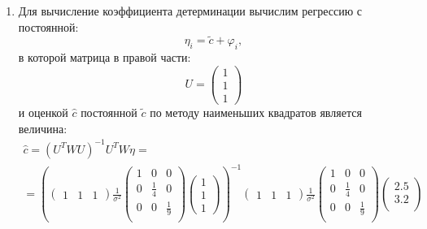 \documentclass[a4paper,12pt]{article}
\begin{document}
\begin{enumerate}
    \item
          Для вычисление коэффициента детерминации вычислим регрессию с постоянной:
          \[
              \eta_i = \widetilde{c} + \varphi_i ,
          \]
          в которой матрица в правой части:
          \[
              U
              = \begin{pmatrix}
                  1 \\
                  1 \\
                  1
              \end{pmatrix}
          \]
          и оценкой $\widehat{c}$ постоянной $\widetilde{c}$ по методу наименьших квадратов является величина:
          \begin{multline*}
              \widehat{c}
              = (U^T W U)^{-1} U^T W \eta = \\
              = \left(
              \begin{pmatrix}
                  1 & 1 & 1
              \end{pmatrix}
              \frac{1}{\sigma^2}
              \begin{pmatrix}
                  1 & 0           & 0           \\
                  0 & \frac{1}{4} & 0           \\
                  0 & 0           & \frac{1}{9} \\
              \end{pmatrix}
              \begin{pmatrix}
                  1 \\
                  1 \\
                  1
              \end{pmatrix}
              \right )^{-1}
              \begin{pmatrix}
                  1 & 1 & 1
              \end{pmatrix}
              \frac{1}{\sigma^2}
              \begin{pmatrix}
                  1 & 0           & 0           \\
                  0 & \frac{1}{4} & 0           \\
                  0 & 0           & \frac{1}{9} \\
              \end{pmatrix}
              \begin{pmatrix}
                  2.5 \\
                  3.2 \\

\end{pmatrix}
\end{multline*}
\end{enumerate}
\end{document}
